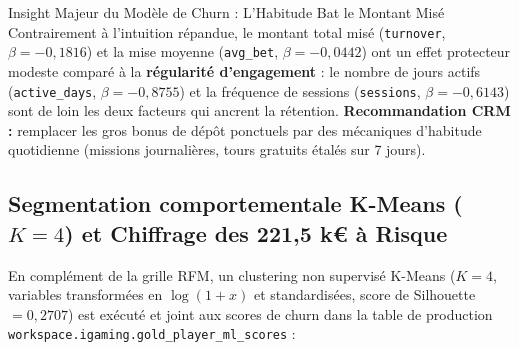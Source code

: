 \documentclass[11pt,a4paper]{article}
\begin{document}
\begin{execbox}{Insight Majeur du Modèle de Churn : L'Habitude Bat le Montant Misé}
Contrairement à l'intuition répandue, le montant total misé (\texttt{turnover}, $\beta = -0,1816$) et la mise moyenne (\texttt{avg\_bet}, $\beta = -0,0442$) ont un effet protecteur modeste comparé à la \textbf{régularité d'engagement} : le nombre de jours actifs (\texttt{active\_days}, $\beta = -0,8755$) et la fréquence de sessions (\texttt{sessions}, $\beta = -0,6143$) sont de loin les deux facteurs qui ancrent la rétention. \textbf{Recommandation CRM :} remplacer les gros bonus de dépôt ponctuels par des mécaniques d'habitude quotidienne (missions journalières, tours gratuits étalés sur 7 jours).
\end{execbox}

\subsection{Segmentation comportementale K-Means ($K=4$) et Chiffrage des 221,5 k\euro{} à Risque}
En complément de la grille RFM, un clustering non supervisé K-Means ($K=4$, variables transformées en $\log(1+x)$ et standardisées, score de Silhouette $= 0,2707$) est exécuté et joint aux scores de churn dans la table de production \texttt{workspace.igaming.gold\_player\_ml\_scores} :

\begin{table}[h!]
\centering
{}
\caption{Synthèse de la table \texttt{gold\_player\_ml\_scores} produite par le modèle \texttt{@champion}.}
\end{table}
\end{document}
